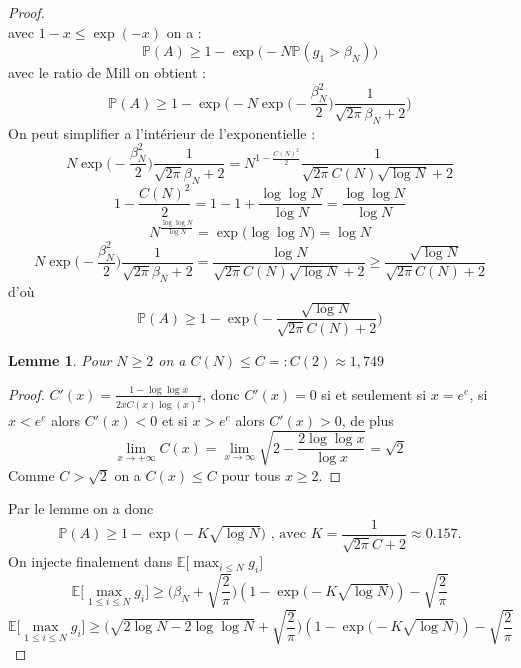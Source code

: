 \documentclass{report}
\newtheorem*{lemme}{Lemme}
\begin{document}
\begin{proof}
\begin{equation*}
	\end{equation*}
	avec $1-x \leq \exp (-x)$ on a :
	\begin{equation*}
	\mathbb{P}(A) \geq 1-\exp\big(-N\mathbb{P}(g_1> \beta_N)\big)
	\end{equation*}
	avec le ratio de Mill on obtient :
	\begin{equation*}
	\mathbb{P}(A) \geq 1-\exp\Big(-N\exp\big(-\frac{\beta_N^2}{2}\big)\frac{1}{\sqrt{2\pi}\beta_N+2}\Big)
	\end{equation*}
	On peut simplifier a l'intérieur de l'exponentielle :
	\begin{equation*}
	N\exp\big(-\frac{\beta_N^2}{2}\big)\frac{1}{\sqrt{2\pi}\beta_N+2} =  N^{1-\frac{C(N)^2}{2}}\frac{1}{\sqrt{2\pi}C(N)\sqrt{\log N}+2}
	\end{equation*}
	\begin{equation*}
	1-\frac{C(N)^2}{2} = 1 - 1+\frac{ \log\log N}{\log N}= \frac{ \log\log N}{\log N}
	\end{equation*}
	\begin{equation*}
	N^{\frac{ \log\log N}{\log N}}=\exp \Big( \log\log N\Big) = \log N
	\end{equation*}
	\begin{equation*}
	N\exp\big(-\frac{\beta_N^2}{2}\big)\frac{1}{\sqrt{2\pi}\beta_N+2} =  \frac{\log N}{\sqrt{2\pi}C(N)\sqrt{\log N}+2}\geq \frac{\sqrt{\log N}}{\sqrt{2\pi}C(N)+2}
	\end{equation*}
	d'où 
	\begin{equation*}
	\mathbb{P}(A) \geq 1-\exp\big(-\frac{\sqrt{\log N}}{\sqrt{2\pi}C(N)+2}\big)
	\end{equation*}
	\begin{lemme}
		Pour $N\geq 2 $ on a $C(N)\leq C=:C(2) \approx 1,749$  
	\end{lemme} 
	
	\begin{proof}
		$C'(x) = \frac{1-\log\log x}{2xC(x)\log(x)^2}$, donc $C'(x)= 0$ si et seulement si $x=e^e$, si $x< e^e$ alors $C'(x)<0$ et si $ x>e^e$ alors $C'(x)>0$, de plus
		\begin{equation*}
		\lim_{x\to +\infty} C(x)= \lim_{x\to \infty}\sqrt{2-\frac{2 \log\log x}{\log x}}=\sqrt{2}
		\end{equation*} 
		Comme $C>\sqrt{2}$ on a $C(x)\leq C$ pour tous $x\geq 2$.
	\end{proof}
	Par le lemme on a donc 
	\begin{equation*}
	\mathbb{P}(A) \geq 1-\exp\big(-K\sqrt{\log N}\big)\text{  ,  avec $K = \frac{1}{\sqrt{2\pi}C+2}\approx 0.157$.}
	\end{equation*}
	On injecte finalement dans $\mathbb{E}\big[\max_{i\leq N} g_i\big]$
	\begin{equation*}
	\mathbb{E}\Big[\max_{1\leq i \leq N}g_i\Big] \geq \big(\beta_N+\sqrt{\frac{2}{\pi}}\big)(1-\exp\big(-K\sqrt{\log N}\big))-\sqrt{\frac{2}{\pi}}
	\end{equation*}
	\begin{equation*}
	\mathbb{E}\Big[\max_{1\leq i \leq N}g_i\Big] \geq \big(\sqrt{2\log N-2 \log\log N}+\sqrt{\frac{2}{\pi}}\big)(1-\exp\big(-K\sqrt{\log N}\big))-\sqrt{\frac{2}{\pi}}
	\end{equation*}
	

\end{proof}
\end{document}

